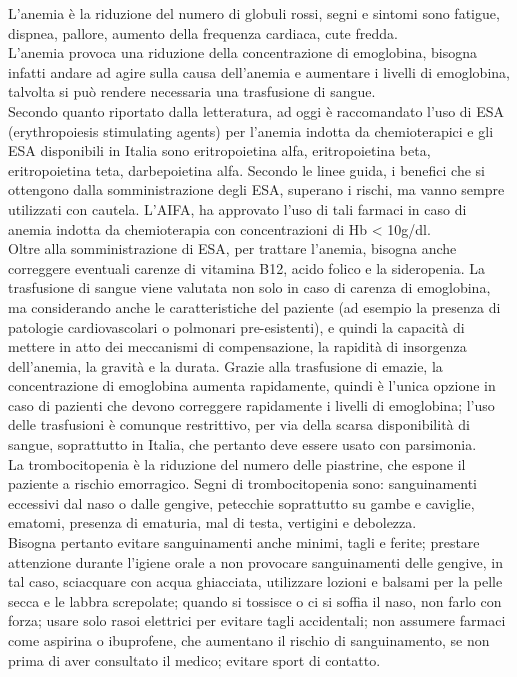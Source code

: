 L’anemia è la riduzione del numero di globuli rossi, segni e sintomi sono fatigue, dispnea, 
pallore, aumento della frequenza cardiaca, cute fredda\cite{LLSLOWCELLS}.\\
L’anemia provoca una riduzione della concentrazione di emoglobina, bisogna infatti  andare ad agire sulla 
causa dell’anemia e aumentare i livelli di emoglobina, talvolta si può rendere necessaria una trasfusione di sangue\cite{AMERICANLOWCELLS}.\\
Secondo quanto riportato dalla letteratura, ad oggi è raccomandato l’uso di ESA (erythropoiesis stimulating agents) 
per l’anemia indotta da chemioterapici e gli ESA disponibili in Italia sono eritropoietina alfa, eritropoietina beta, 
eritropoietina teta, darbepoietina alfa. Secondo le linee guida, i benefici che si ottengono dalla somministrazione 
degli ESA, superano i rischi, ma vanno sempre utilizzati con cautela. L’AIFA, ha approvato l’uso di tali farmaci 
in caso di anemia indotta da chemioterapia con concentrazioni di Hb < 10g/dl\cite{AIOMTOSS}.\\
Oltre alla somministrazione di ESA, per trattare l’anemia, bisogna anche correggere eventuali carenze di vitamina B12, 
acido folico e la sideropenia. La trasfusione di sangue viene valutata non solo in caso di carenza di emoglobina, 
ma considerando anche le caratteristiche del paziente (ad esempio la presenza di patologie cardiovascolari o 
polmonari pre-esistenti), e quindi la capacità di mettere in atto dei meccanismi di compensazione, la rapidità di 
insorgenza dell’anemia, la gravità e la durata. Grazie alla trasfusione di emazie, la concentrazione di emoglobina 
aumenta rapidamente, quindi è l’unica opzione in caso di pazienti che devono correggere rapidamente i livelli di 
emoglobina; l’uso delle trasfusioni è comunque restrittivo, per via della scarsa disponibilità di sangue, 
soprattutto in Italia, che pertanto deve essere usato con parsimonia\cite{AIOMTOSS}.\\

La trombocitopenia è la riduzione del numero delle piastrine, che espone il paziente a rischio emorragico. 
Segni di trombocitopenia sono: sanguinamenti eccessivi dal naso o dalle gengive, petecchie soprattutto su 
gambe e caviglie, ematomi, presenza di ematuria, mal di testa, vertigini e debolezza\cite{LLSLOWCELLS}.\\
Bisogna pertanto evitare sanguinamenti anche minimi, tagli e ferite; prestare attenzione durante l’igiene orale a non 
provocare sanguinamenti delle gengive, in tal caso, sciacquare con acqua ghiacciata, utilizzare lozioni e balsami 
per la pelle secca e le labbra screpolate; quando si tossisce o ci si soffia il naso, non farlo con forza; 
usare solo rasoi elettrici per evitare tagli accidentali; non assumere farmaci come aspirina o ibuprofene, 
che aumentano il rischio di sanguinamento, se non prima di aver consultato il medico; evitare sport di contatto\cite{AMERICANPLATELET}.\\

